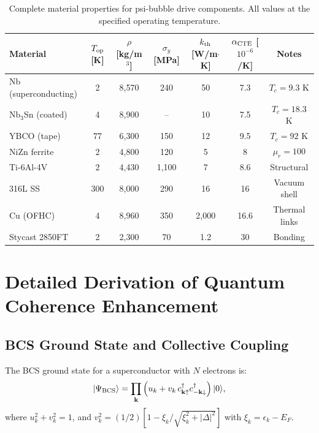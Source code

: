 \documentclass[twocolumn,prl,superscriptaddress,nofootinbib,longbibliography,floatfix]{revtex4-2}
\begin{document}
\begin{table}[t]
\centering
\caption{Complete material properties for psi-bubble drive components.
All values at the specified operating temperature.}
\label{tab:materials-complete}
\begin{ruledtabular}
\begin{tabular}{lcccccc}
Material & $T_{\rm op}$ [K] & $\rho$ [kg/m$^3$] &
$\sigma_y$ [MPa] & $k_{\rm th}$ [W/m$\cdot$K] &
$\alpha_{\rm CTE}$ [$10^{-6}$/K] & Notes \\
\hline
Nb (superconducting) & 2 & 8{,}570 & 240 & 50 & 7.3 & $T_c = 9.3$ K \\
Nb$_3$Sn (coated) & 4 & 8{,}900 & -- & 10 & 7.5 & $T_c = 18.3$ K \\
YBCO (tape) & 77 & 6{,}300 & 150 & 12 & 9.5 & $T_c = 92$ K \\
NiZn ferrite & 2 & 4{,}800 & 120 & 5 & 8 & $\mu_r = 100$ \\
Ti-6Al-4V & 2 & 4{,}430 & 1{,}100 & 7 & 8.6 & Structural \\
316L SS & 300 & 8{,}000 & 290 & 16 & 16 & Vacuum shell \\
Cu (OFHC) & 4 & 8{,}960 & 350 & 2{,}000 & 16.6 & Thermal links \\
Stycast 2850FT & 2 & 2{,}300 & 70 & 1.2 & 30 & Bonding \\
\end{tabular}
\end{ruledtabular}
\end{table}

\section{Detailed Derivation of Quantum Coherence Enhancement}
\label{app:quantum}

\subsection{BCS Ground State and Collective Coupling}

The BCS ground state for a superconductor with $N$ electrons is:
\begin{equation}
|\Psi_{\rm BCS}\rangle = \prod_{\mathbf{k}}
\left(u_k + v_k\,c_{\mathbf{k}\uparrow}^\dagger
c_{-\mathbf{k}\downarrow}^\dagger\right)|0\rangle,
\label{eq:BCS-state}
\end{equation}
where $u_k^2 + v_k^2 = 1$, and $v_k^2 = (1/2)[1 -
\xi_k/\sqrt{\xi_k^2 + |\Delta|^2}]$ with $\xi_k = \epsilon_k - E_F$.
\end{document}
